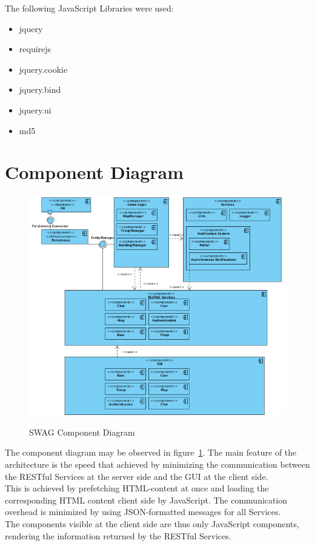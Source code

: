\documentclass[a4paper]{article}
\begin{document}
The following JavaScript Libraries were used:
\begin{itemize}
\item jquery
\item requirejs
\item jquery.cookie
\item jquery.bind
\item jquery.ui
\item md5
\end{itemize}


\clearpage

\section{Component Diagram}

\begin{figure}[ht!]
  \begin{center}
  \hspace*{-90pt}
  \includegraphics[scale=0.80]{fig/components.png}
  \label{fig:component_diagram}
  \caption{SWAG Component Diagram}
  \end{center}
\end{figure}

\hspace*{0pt}

The component diagram may be observed in figure~\ref{fig:component_diagram}. The main feature of the architecture is the speed that achieved by minimizing the communication between the RESTful Services at the server side and the GUI at the client side.\\
This is achieved by prefetching HTML-content at once and loading the corresponding HTML content client side by JavaScript. The communication overhead is minimized by using JSON-formatted messages for all Services.\\
The components visible at the client side are thus only JavaScript components, rendering the information returned by the RESTful Services.
\end{document}
